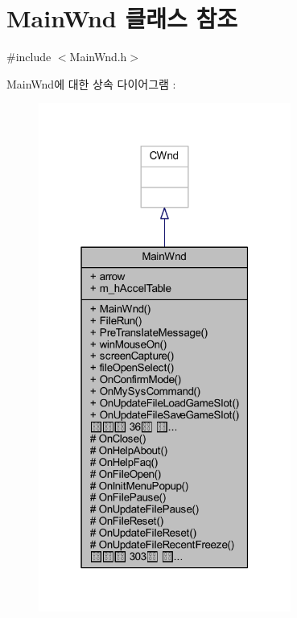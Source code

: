 \hypertarget{class_main_wnd}{}\section{Main\+Wnd 클래스 참조}
\label{class_main_wnd}


{\ttfamily \#include $<$Main\+Wnd.\+h$>$}



Main\+Wnd에 대한 상속 다이어그램 \+: \nopagebreak
\begin{figure}[H]
\begin{center}
\leavevmode
\includegraphics[width=235pt]{class_main_wnd__inherit__graph}
\end{center}
\end{figure}


